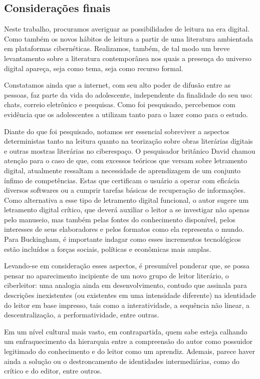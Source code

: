\begin{refsection}
    \section{Considerações finais}

    Neste trabalho, procuramos averiguar as possibilidades de leitura na era digital. Como também os novos hábitos de leitura a partir de uma literatura ambientada em plataformas cibernéticas. Realizamos, também, de tal modo um breve levantamento sobre a literatura contemporânea nos quais a presença do universo digital apareça, seja como tema, seja como recurso formal.  

    Constatamos ainda que a internet, com seu alto poder de difusão entre as pessoas, faz parte da vida do adolescente, independente   da finalidade do seu uso: chats, correio eletrônico e pesquisas. Como foi pesquisado, percebemos com evidência que os adolescentes a utilizam tanto para o lazer como para o estudo. 

    Diante do que foi pesquisado, notamos ser essencial sobreviver a aspectos deterministas tanto na leitura quanto na teorização sobre obras literárias digitais e outras mostras literárias no ciberespaço. O pesquisador britânico David \textcite{Buckingham2010} chamou atenção para o caso de que, com excessos teóricos que versam sobre letramento digital, atualmente ressaltam a necessidade de aprendizagem de um conjunto ínfimo de competências. Estas que certificam o usuário a operar com eficácia diversos softwares ou a cumprir tarefas básicas de recuperação de informações. Como alternativa a esse tipo de letramento digital funcional, o autor sugere um letramento digital crítico, que deverá auxiliar o leitor a se investigar não apenas pelo manuseio, mas também pelas fontes do conhecimento disponível, pelos interesses de seus elaboradores e   pelos     formatos    como ela    representa o    mundo. Para Buckingham, é importante indagar como esses incrementos tecnológicos estão incluídos a forças sociais, políticas e econômicas mais amplas. 

    Levando-se em consideração esses aspectos, é presumível ponderar que, se possa pensar no aparecimento incipiente de um novo grupo de leitor literário, o ciberleitor: uma analogia ainda em desenvolvimento, contudo que assinala para descrições inexistentes (ou existentes em uma intensidade diferente) na identidade do leitor em base impresso, tais como a interatividade, a sequência não linear, a descentralização, a performatividade, entre outras.   

    Em um nível cultural mais vasto, em contrapartida, quem sabe esteja calhando um enfraquecimento da hierarquia entre a compreensão do autor como possuidor legitimado do conhecimento e do leitor como um aprendiz. Ademais, parece haver ainda a solução ou o destroncamento de identidades intermediárias, como do crítico e do editor, entre outros.  


\end{refsection}
